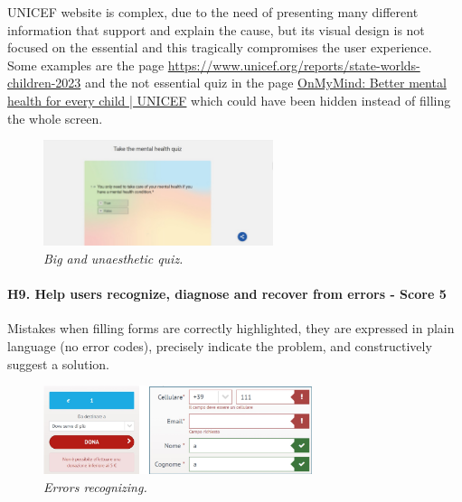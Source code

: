 \newline UNICEF website is complex, due to the need of presenting many different information that support and explain the cause, but its visual design is not focused on the essential and this tragically compromises the user experience.
\newline Some examples are the page \href{https://www.unicef.org/reports/state-worlds-children-2023}{https://www.unicef.org/reports/state-worlds-children-2023} and the not essential quiz in the page \href{https://www.unicef.org/on-my-mind}{OnMyMind: Better mental health for every child | UNICEF} which could have been hidden instead of filling the whole screen. 
\begin{figure}[!h]
	\begin{center}
		\includegraphics[width=0.6\textwidth]{FinalScores14.jpg}
		\captionsetup{font=small}
		\caption{\textit{Big and unaesthetic quiz.}}
	\end{center}
\end{figure}
\newline
\newline \paragraph{H9. Help users recognize, diagnose and recover from errors - Score 5}	Mistakes when filling forms are correctly highlighted, they are expressed in plain language (no error codes), precisely indicate the problem, and constructively suggest a solution.
\begin{figure}[!h]
	\begin{center}
		\includegraphics[width=0.7\textwidth]{FinalScores15.jpg}
		\captionsetup{font=small}
		\caption{\textit{Errors recognizing.}}
	\end{center}
\end{figure}
